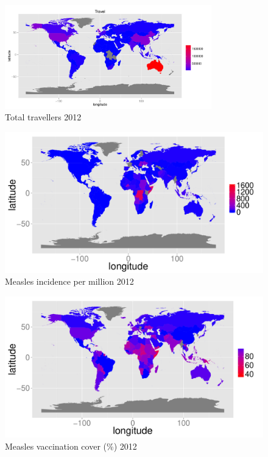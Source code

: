 \documentclass{article}
\begin{document}
\begin{figure}
     \centering
     \includegraphics[width=0.8\textwidth]{totnp1.pdf}
     \caption{Total travellers 2012}
     \label{fig:tottravellers}
\end{figure}


\begin{figure}[h!]
\begin{center}
\includegraphics{draftfinalreport-028}
\end{center}
\caption{Measles incidence per million 2012}
\label{fig:incidence12}
\end{figure}

\begin{figure}[h!]
\begin{center}
\includegraphics{draftfinalreport-029}
\end{center}
\caption{Measles vaccination cover (\%) 2012 }
\label{fig:cover12}
\end{figure}
\end{document}
